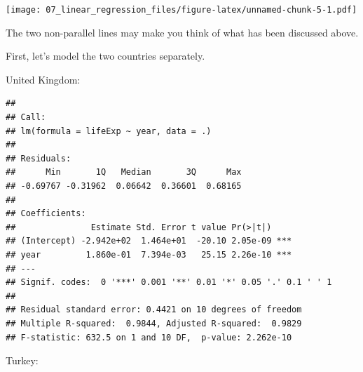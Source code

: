 \documentclass[12pt,]{krantz}
\makeatletter
\newenvironment{Shaded}{\begin{snugshade}}{\end{snugshade}}
\newcommand{\DataTypeTok}[1]{\textcolor[rgb]{0.13,0.29,0.53}{#1}}
\newcommand{\KeywordTok}[1]{\textcolor[rgb]{0.13,0.29,0.53}{\textbf{#1}}}
\newcommand{\NormalTok}[1]{#1}
\newcommand{\OperatorTok}[1]{\textcolor[rgb]{0.81,0.36,0.00}{\textbf{#1}}}
\newcommand{\StringTok}[1]{\textcolor[rgb]{0.31,0.60,0.02}{#1}}
\newenvironment{kframe}{%
\medskip{}
\setlength{\fboxsep}{.8em}
 \def\at@end@of@kframe{}%
 \ifinner\ifhmode%
  \def\at@end@of@kframe{\end{minipage}}%
  \begin{minipage}{\columnwidth}%
 \fi\fi%
 \def\FrameCommand##1{\hskip\@totalleftmargin \hskip-\fboxsep
 \colorbox{shadecolor}{##1}\hskip-\fboxsep
     \hskip-\linewidth \hskip-\@totalleftmargin \hskip\columnwidth}%
 \MakeFramed {\advance\hsize-\width
   \@totalleftmargin\z@ \linewidth\hsize
   \@setminipage}}%
 {\par\unskip\endMakeFramed%
 \at@end@of@kframe}
\renewenvironment{Shaded}{\begin{kframe}}{\end{kframe}}
\theoremstyle{definition}
\theoremstyle{definition}
\theoremstyle{definition}
\theoremstyle{remark}
\makeatother
\begin{document}
\texttt{[image: 07\_linear\_regression\_files/figure-latex/unnamed-chunk-5-1.pdf]}

The two non-parallel lines may make you think of what has been discussed
above.

First, let's model the two countries separately.

United Kingdom:

\begin{Shaded}
\end{Shaded}

\begin{verbatim}
## 
## Call:
## lm(formula = lifeExp ~ year, data = .)
## 
## Residuals:
##      Min       1Q   Median       3Q      Max 
## -0.69767 -0.31962  0.06642  0.36601  0.68165 
## 
## Coefficients:
##               Estimate Std. Error t value Pr(>|t|)    
## (Intercept) -2.942e+02  1.464e+01  -20.10 2.05e-09 ***
## year         1.860e-01  7.394e-03   25.15 2.26e-10 ***
## ---
## Signif. codes:  0 '***' 0.001 '**' 0.01 '*' 0.05 '.' 0.1 ' ' 1
## 
## Residual standard error: 0.4421 on 10 degrees of freedom
## Multiple R-squared:  0.9844, Adjusted R-squared:  0.9829 
## F-statistic: 632.5 on 1 and 10 DF,  p-value: 2.262e-10
\end{verbatim}

Turkey:

\begin{Shaded}
\end{Shaded}
\end{document}
